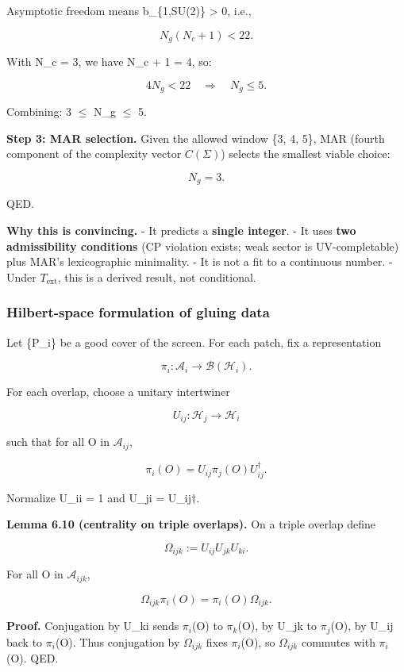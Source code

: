 \documentclass[11pt,a4paper]{article}
\theoremstyle{remark}
\begin{document}
Asymptotic freedom means b\_\{1,SU(2)\} \textgreater{} 0, i.e.,

\[
N_g(N_c + 1) < 22.
\]

With N\_c = 3, we have N\_c + 1 = 4, so:

\[
4 N_g < 22 \quad \Rightarrow \quad N_g \le 5.
\]

Combining: 3 \ensuremath{\leq} N\_g \ensuremath{\leq} 5.

\textbf{Step 3: MAR selection.} Given the allowed window \{3, 4, 5\}, MAR
(fourth component of the complexity vector \(C(\Sigma)\)) selects the
smallest viable choice:

\[
N_g = 3.
\]

QED.

\textbf{Why this is convincing.}
- It predicts a \textbf{single integer}.
- It uses \textbf{two admissibility conditions} (CP violation exists; weak
sector is UV-completable) plus MAR's lexicographic minimality.
- It is not a fit to a continuous number.
- Under \(T_{\mathrm{ext}}\), this is a derived result, not conditional.

\subsubsection{Hilbert-space formulation of gluing data}\label{hilbert-space-formulation-of-gluing-data}

Let \{P\_i\} be a good cover of the screen. For each patch, fix a representation

\[
\pi_i: \mathcal{A}_i \to \mathcal B(\mathcal H_i).
\]

For each overlap, choose a unitary intertwiner

\[
U_{ij}: \mathcal H_j \to \mathcal H_i
\]

such that for all O in $\mathcal{A}_{ij}$,

\[
\pi_i(O) = U_{ij} \pi_j(O) U_{ij}^\dagger.
\]

Normalize U\_ii = 1 and U\_ji = U\_ij\ensuremath{\dagger}.

\textbf{Lemma 6.10 (centrality on triple overlaps).} On a triple overlap define

\[
\Omega_{ijk} := U_{ij} U_{jk} U_{ki}.
\]

For all O in $\mathcal{A}_{ijk}$,

\[
\Omega_{ijk} \pi_i(O) = \pi_i(O) \Omega_{ijk}.
\]

\textbf{Proof.} Conjugation by U\_ki sends $\pi_i$(O) to $\pi_k$(O), by U\_jk to $\pi_j$(O),
by U\_ij back to $\pi_i$(O). Thus conjugation by $\Omega_{ijk}$ fixes $\pi_i$(O), so
$\Omega_{ijk}$ commutes with $\pi_i$(O). QED.
\end{document}
